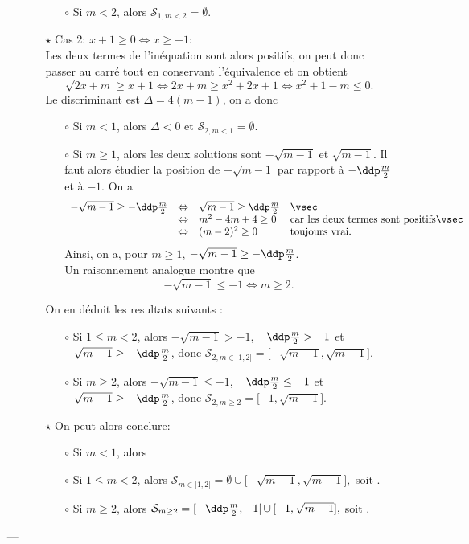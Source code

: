 \documentclass[a4paper, 11pt,reqno]{article}
\begin{document}
\begin{correction}
\begin{enumerate}
\begin{itemize}
\begin{itemize}
\begin{itemize}
\item[$\circ$] Si $m<2$, alors $\mathcal{S}_{1,m<2}=\emptyset$.
\end{itemize}
\item[$\star$] Cas 2: $x+1\geq 0\Leftrightarrow x\geq -1$:\\
\noindent Les deux termes de l'in\'equation sont alors positifs, on peut donc passer au carr\'e tout en conservant l'\'equivalence et on obtient
$$
\sqrt{2x+m}\geq x+1 \Leftrightarrow  2x+m\geq x^2+2x+1\Leftrightarrow x^2+1-m\leq 0.$$
Le discriminant est $\Delta=4(m-1)$, on a donc
\begin{itemize}
\item[$\circ$] Si $m<1$, alors $\Delta<0$ et $\mathcal{S}_{2,m<1}=\emptyset$.
\item[$\circ$] Si $m\geq 1$, alors les deux solutions sont $-\sqrt{m-1}$ et $\sqrt{m-1}$.
Il faut alors \'etudier la position de $-\sqrt{m-1}$ par rapport \`a $-\ddp\frac{m}{2}$ et \`a $-1$.
On a
$$\begin{array}{llll}
-\sqrt{m-1}\geq -\ddp\frac{m}{2}&\Leftrightarrow &\sqrt{m-1}\geq \ddp\frac{m}{2} &  \vsec\\
&\Leftrightarrow  & m^2-4m+4\geq 0 & \hbox{car les deux termes sont positifs}\vsec\\ 
&\Leftrightarrow & (m-2)^2\geq 0 & \hbox{toujours vrai.}
\end{array}$$
Ainsi, on a, pour $m\geq 1$, $-\sqrt{m-1}\geq -\ddp\frac{m}{2}$.\\
\noindent Un raisonnement analogue montre que
$$-\sqrt{m-1}\leq -1\Leftrightarrow m\geq 2.$$
\end{itemize}
On en d\'eduit les r\?esultats suivants :
\begin{itemize}
\item[$\circ$]  Si $1\leq m<2$, alors $-\sqrt{m-1}>-1$, $-\ddp\frac{m}{2}>-1$ et $-\sqrt{m-1}\geq -\ddp\frac{m}{2}$, donc $\mathcal{S}_{2,m\in [1,2[}=\lbrack -\sqrt{m-1},\sqrt{m-1}\rbrack$.
\item[$\circ$]  Si $m\geq 2$, alors  $-\sqrt{m-1}\leq -1$, $-\ddp\frac{m}{2}\leq -1$ et $-\sqrt{m-1}\geq -\ddp\frac{m}{2}$, donc $\mathcal{S}_{2,m\geq2}=\lbrack -1,\sqrt{m-1}\rbrack$.
\end{itemize}
\item[$\star$]  
On peut alors conclure:
\begin{itemize}
\item[$\circ$]  Si $m<1$, alors 
\item[$\circ$]  Si $1\leq m<2$, alors $\mathcal{S}_{m\in [1,2[} = \emptyset \cup \lbrack -\sqrt{m-1},\sqrt{m-1}\rbrack,$ soit \fbox{$\mathcal{S}_{m\in [1,2[}=\lbrack -\sqrt{m-1},\sqrt{m-1}\rbrack$}.
\item[$\circ$]  Si $m\geq 2$, alors $\mathcal{S}_{m\geq2}= \lbrack -\ddp\frac{m}{2},-1\lbrack \, \cup \, \lbrack -1,\sqrt{m-1}\rbrack,$ soit .
\end{itemize}
\end{itemize}
\end{itemize}
---


\end{enumerate}
\end{correction}
\end{document}
